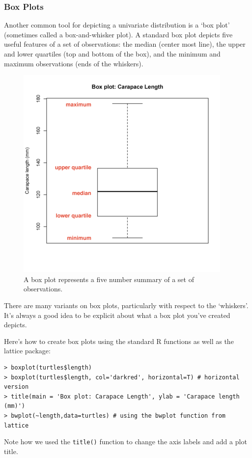 \documentclass{article}
\makeatletter
\def\maxwidth{
    \ifdim\Gin@nat@width > 3.5in 
        3.5in
    \else\Gin@nat@width
    \fi}
\let\Oldincludegraphics\includegraphics
\renewcommand{\includegraphics}[1]{\Oldincludegraphics[width=\maxwidth]{#1}}
\makeatother
\begin{document}
\subsubsection{Box Plots}

Another common tool for depicting a univariate distribution is a `box
plot' (sometimes called a box-and-whisker plot). A standard box plot
depicts five useful features of a set of observations: the median
(center most line), the upper and lower quartiles (top and bottom of the
box), and the minimum and maximum observations (ends of the whiskers).

\begin{figure}[htbp]
\centering
\includegraphics{lecture-02/boxplot-labeled.png}
\caption{A box plot represents a five number summary of a set of
observations.}
\end{figure}

There are many variants on box plots, particularly with respect to the
`whiskers'. It's always a good idea to be explicit about what a box plot
you've created depicts.

Here's how to create box plots using the standard R functions as well as
the lattice package:

\begin{lstlisting}
> boxplot(turtles$length)
> boxplot(turtles$length, col='darkred', horizontal=T) # horizontal version 
> title(main = 'Box plot: Carapace Length', ylab = 'Carapace length (mm)')
> bwplot(~length,data=turtles) # using the bwplot function from lattice
\end{lstlisting}
Note how we used the \lstinline!title()! function to change the axis
labels and add a plot title.
\end{document}
